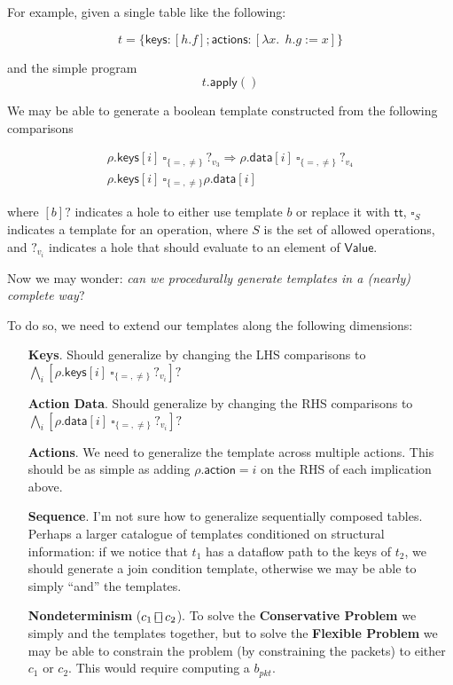 \documentclass{article}
\newcommand{\TRUE}{\mathsf{tt}}
\newcommand{\Value}{\mathsf{Value}}
\newcommand{\action}{\mathsf{action}}
\newcommand{\actions}{\mathsf{actions}}
\newcommand{\keys}{\mathsf{keys}}
\newcommand{\data}{\mathsf{data}}
\newcommand{\apply}{\mathsf{apply}}
\newcommand{\choiceop}{\rotatebox[origin=c]{90}{$\sqsubset\!\!\!\sqsupset$}}
\newcommand{\choice}{\mathbin{\choiceop}}
\begin{document}
For example, given a single table like the following:

\[t = \{\keys: [h.f]; \actions: [\lambda x.~~h.g:= x]\}\]

and the simple program \[t.\apply()\]

We may be able to generate a boolean template constructed from the following
comparisons

\[
\begin{array}{l}
  \rho.\keys[i]~\square_{\{=,\neq\}}~?_{v_3} \Rightarrow \rho.\data[i]~\square_{\{=,\neq\}}~?_{v_4} \\

  \rho.\keys[i]~\square_{\{=,\neq\}}\rho.\data[i]
\end{array}\]

where $[b]?$ indicates a hole to either use template $b$ or replace it with
$\TRUE$, $\square_S$ indicates a template for an operation, where $S$ is the set
of allowed operations, and $?_{v_i}$ indicates a hole that should evaluate to an element
of $\Value$.



Now we may wonder: \emph{can we procedurally generate templates in a (nearly) complete way}?

To do so, we need to extend our templates along the following dimensions:
\begin{enumerate}[align=left]
\item[\textbf{Keys}.] Should generalize by changing the LHS comparisons to $
  \bigwedge_i[\rho.\keys[i]~\square_{\{=,\neq\}}~?_{v_i}]?$
\item[\textbf{Action Data}.] Should generalize by changing the RHS comparisons to $\bigwedge_i[\rho.\data[i]~\square_{\{=,\neq\}}~?_{v_i}]?$
\item[\textbf{Actions}.] We need to generalize the template across multiple actions. This should be as simple as adding $\rho.\action = i$ on the RHS of each implication above.
\item[\textbf{Sequence}.] I'm not sure how to generalize sequentially composed tables.
  Perhaps a larger catalogue of templates conditioned on structural information:
  if we notice that $t_1$ has a dataflow path to the keys of $t_2$, we should
  generate a join condition template, otherwise we may be able to simply ``and'' the templates.

\item[\textbf{Nondeterminism} ($c_1 \choice c_2$).] To solve the \textbf{Conservative
  Problem} we simply and the templates together, but to solve the
  \textbf{Flexible Problem} we may be able to constrain the problem (by
  constraining the packets) to either $c_1$ or $c_2$. This would require
  computing a $b_{\textit{pkt}}$.
\end{enumerate}
\end{document}
